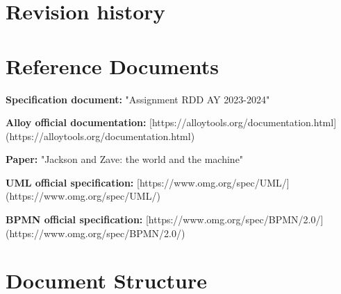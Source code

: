 \section{Revision history}



\section{Reference Documents}

\begin{description}[labelwidth=4em, leftmargin=5em, style=nextline]
    \item \textbf{Specification document:} "Assignment RDD AY 2023-2024"
    \item \textbf{Alloy official documentation:} [https://alloytools.org/documentation.html](https://alloytools.org/documentation.html)
    \item \textbf{Paper:} "Jackson and Zave: the world and the machine"
    \item \textbf{UML official specification:} [https://www.omg.org/spec/UML/](https://www.omg.org/spec/UML/)
    \item \textbf{BPMN official specification:} [https://www.omg.org/spec/BPMN/2.0/](https://www.omg.org/spec/BPMN/2.0/)
\end{description}


\section{Document Structure}